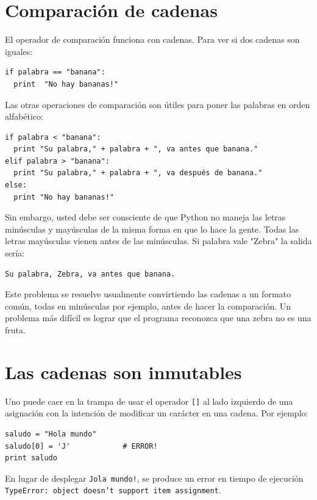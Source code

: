 \section{Comparación de cadenas}

El operador de comparación funciona con cadenas. Para ver si 
dos cadenas son iguales:

\beforeverb
\begin{verbatim}
if palabra == "banana":
  print  "No hay bananas!"
\end{verbatim}
\afterverb
%

Las otras operaciones de comparación son útiles para poner
las palabras en orden alfabético:

\beforeverb
\begin{verbatim}
if palabra < "banana":
  print "Su palabra," + palabra + ", va antes que banana."
elif palabra > "banana":
  print "Su palabra," + palabra + ", va después de banana."
else:
  print "No hay bananas!"
\end{verbatim}
\afterverb
%
Sin embargo, usted debe ser consciente de que Python no 
maneja las letras minúsculas y mayúsculas de la misma forma
en que lo hace la gente. Todas las letras mayúsculas vienen
antes de las minúsculas.  Si palabra vale "Zebra" la salida
sería:

\beforeverb
\begin{verbatim}
Su palabra, Zebra, va antes que banana.
\end{verbatim}
\afterverb
%
Este problema se resuelve usualmente convirtiendo las cadenas
a un formato común, todas en minúsculas por ejemplo, antes
de hacer la comparación. Un problema más difícil es lograr
que el programa reconozca que una zebra no es una fruta.


\section{Las cadenas son inmutables}

Uno puede caer en la trampa de usar el operador \texttt{[]} al lado
izquierdo de una asignación con la intención de modificar un 
carácter en una cadena. Por ejemplo:

\beforeverb
\begin{verbatim}
saludo = "Hola mundo"
saludo[0] = 'J'            # ERROR!
print saludo
\end{verbatim}
\afterverb
%
En lugar de desplegar \texttt{Jola mundo!}, se produce
un error en tiempo de ejecución \texttt{TypeError: object doesn't support item
assignment}.

